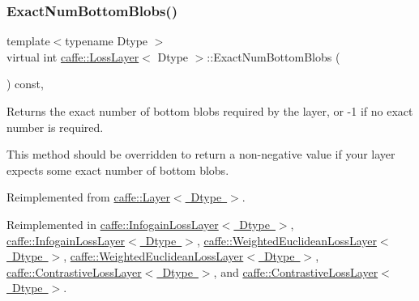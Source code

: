 \subsubsection{\texorpdfstring{Exact\+Num\+Bottom\+Blobs()}{ExactNumBottomBlobs()}\hspace{0.1cm}{\footnotesize\ttfamily [1/2]}}
{\footnotesize\ttfamily template$<$typename Dtype $>$ \\
virtual int \mbox{\hyperlink{classcaffe_1_1_loss_layer}{caffe\+::\+Loss\+Layer}}$<$ Dtype $>$\+::Exact\+Num\+Bottom\+Blobs (\begin{DoxyParamCaption}{ }\end{DoxyParamCaption}) const\hspace{0.3cm}{\ttfamily [inline]}, {\ttfamily [virtual]}}



Returns the exact number of bottom blobs required by the layer, or -\/1 if no exact number is required. 

This method should be overridden to return a non-\/negative value if your layer expects some exact number of bottom blobs. 

Reimplemented from \mbox{\hyperlink{classcaffe_1_1_layer_a8e5ee0494d85f5f55fc4396537cbc60f}{caffe\+::\+Layer$<$ Dtype $>$}}.



Reimplemented in \mbox{\hyperlink{classcaffe_1_1_infogain_loss_layer_aa03732f381764180748479c83b289869}{caffe\+::\+Infogain\+Loss\+Layer$<$ Dtype $>$}}, \mbox{\hyperlink{classcaffe_1_1_infogain_loss_layer_aa03732f381764180748479c83b289869}{caffe\+::\+Infogain\+Loss\+Layer$<$ Dtype $>$}}, \mbox{\hyperlink{classcaffe_1_1_weighted_euclidean_loss_layer_a2ac1ab6f657c6531dee37f80a971bbd9}{caffe\+::\+Weighted\+Euclidean\+Loss\+Layer$<$ Dtype $>$}}, \mbox{\hyperlink{classcaffe_1_1_weighted_euclidean_loss_layer_a2ac1ab6f657c6531dee37f80a971bbd9}{caffe\+::\+Weighted\+Euclidean\+Loss\+Layer$<$ Dtype $>$}}, \mbox{\hyperlink{classcaffe_1_1_contrastive_loss_layer_aa6f3ad6918e64ffa1828e821accf25e9}{caffe\+::\+Contrastive\+Loss\+Layer$<$ Dtype $>$}}, and \mbox{\hyperlink{classcaffe_1_1_contrastive_loss_layer_aa6f3ad6918e64ffa1828e821accf25e9}{caffe\+::\+Contrastive\+Loss\+Layer$<$ Dtype $>$}}.

\mbox{\label{classcaffe_1_1_loss_layer_af1620064baefb711e2c767bdc92b6fb1}} 
